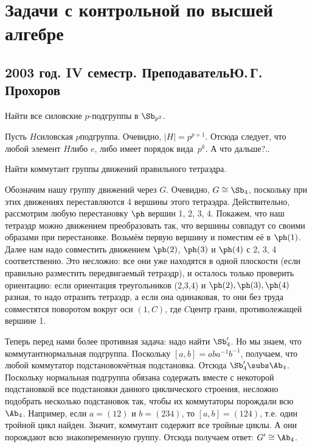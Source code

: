 \documentclass[a4paper]{article}
\begin{document}
\section*{Задачи с контрольной по высшей алгебре}
\subsection*{2003 год. IV семестр. Преподаватель\т Ю.\,Г.\,Прохоров}

\begin{problem}
Найти все силовские $p$-подгруппы в $\Sb_{p^2}$.
\end{problem}
\begin{solution}
Пусть $H$\т силовская $p$\д подгруппа. Очевидно, $|H|=p^{p+1}$. Отсюда следует, что любой
элемент $H$\т либо $e$, либо имеет порядок вида~$p^k$.
А что дальше?..
\end{solution}

\begin{problem}
Найти коммутант группы движений правильного тетраэдра.
\end{problem}
\begin{solution}
Обозначим нашу группу движений через $G$. Очевидно, $G \cong \Sb_4$, поскольку при этих движениях
переставляются 4 вершины этого тетраэдра. Действительно, рассмотрим любую перестановку $\ph$ вершин 1, 2, 3, 4.
Покажем, что наш тетраэдр можно движением преобразовать так, что вершины совпадут со своими образами при
перестановке. Возьмём  первую вершину и поместим её в $\ph(1)$. Далее нам надо совместить движением $\ph(2)$,
$\ph(3)$ и $\ph(4)$ с 2, 3, 4 соответственно. Это несложно: все они уже находятся в одной плоскости (если
правильно разместить передвигаемый тетраэдр), и осталось только проверить ориентацию: если ориентация
треугольников (2,3,4) и $\ph(2),\ph(3),\ph(4)$ разная, то надо отразить тетраэдр, а если она одинаковая, то
они без труда совместятся поворотом вокруг оси $(1,C)$, где $C$\т центр грани, противолежащей вершине 1.

Теперь перед нами более противная задача: надо найти $\Sb_4'$. Но мы знаем, что коммутант\т нормальная
подгруппа. Поскольку $[a,b]=aba^{-1}b^{-1}$, получаем, что любой коммутатор подстановок\т чётная
подстановка. Отсюда $\Sb_4' \subs \Ab_4$. Поскольку нормальная подгруппа обязана содержать вместе с
некоторой подстановкой все подстановки данного циклического строения, несложно подобрать несколько
подстановок так, чтобы их коммутаторы порождали всю $\Ab_4$. Например, если $a=(12)$ и $b=(234)$, то
$[a,b]=(124)$, т.е. один тройной цикл найден. Значит, коммутант содержит все тройные циклы. А они порождают
всю знакопеременную группу. Отсюда получаем ответ: $G' \cong \Ab_4$.
\end{solution}
\end{document}
